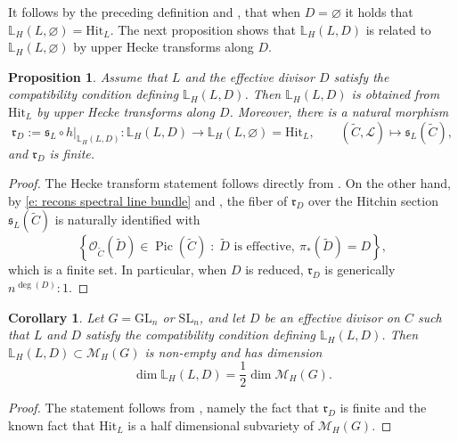 \documentclass[twoside, 11pt]{article}
\numberwithin{equation}{section}
\theoremstyle{theorem}
\numberwithin{theorem}{section}
\newtheorem{proposition}[proposition]{Proposition}
\newtheorem{corollary}[corollary]{Corollary}
\theoremstyle{definition}
\begin{document}
It follows by the preceding definition and , that when \(D=\varnothing\) it holds that 
\(
\mathbb L_H(L,\varnothing)=\mathrm{Hit}_L .
\)
The next proposition shows that \(\mathbb L_H(L,D)\) is related to \(\mathbb L_H(L,\varnothing)\) by upper Hecke transforms along \(D\).

\begin{proposition}\label{p: relation to Hecke}
Assume that \(L\) and the effective divisor \(D\) satisfy the compatibility condition defining \(\mathbb L_H(L,D)\). Then \(\mathbb L_H(L,D)\) is obtained from \(\mathrm{Hit}_L\) by upper Hecke transforms along \(D\). Moreover, there is a natural morphism
\[
\mathfrak r_D:=\mathfrak s_L\circ h|_{\mathbb L_H(L,D)}:\mathbb L_H(L,D)\longrightarrow \mathbb L_H(L,\varnothing)=\mathrm{Hit}_L,
\qquad
(\widetilde C,\mathcal L)\longmapsto \mathfrak s_L(\widetilde C),
\]
and \(\mathfrak r_D\) is finite.
\end{proposition}

\begin{proof}
The Hecke transform statement follows directly from . On the other hand, by \eqref{e: recons spectral line bundle} and , the fiber of \(\mathfrak r_D\) over the Hitchin section \(\mathfrak s_L(\widetilde C)\) is naturally identified with
\[
\left\{
\mathcal O_{\widetilde C}(\widetilde D)\in \operatorname{Pic}(\widetilde C)\;:\;
\widetilde D \text{ is effective},\ \pi_\ast(\widetilde D)=D
\right\},
\]
which is a finite set. In particular, when \(D\) is reduced,  \( \mathfrak r_D \)
is generically \(n^{\deg (D)}\!:\!1\).
\end{proof}

\begin{corollary}\label{c: non-empty and half dim Higgs}
Let \(G=\mathrm{GL}_n\) or \(\mathrm{SL}_n\), and let \(D\) be an effective divisor on \(C\) such that \(L\) and \(D\) satisfy the compatibility condition defining \(\mathbb L_H(L,D)\). Then \(\mathbb L_H(L,D)\subset \mathcal M_H(G)\) is non-empty and has dimension
\[
\dim \mathbb L_H(L,D)=\frac{1}{2}\dim \mathcal M_H(G).
\]
\end{corollary}

\begin{proof}
    The statement follows from , namely the fact that $\mathfrak r_D$ is finite and the known fact that $\mathrm{Hit}_L$ is a half dimensional subvariety of $\mathcal{M}_{H}(G)$.
\end{proof}
\end{document}
